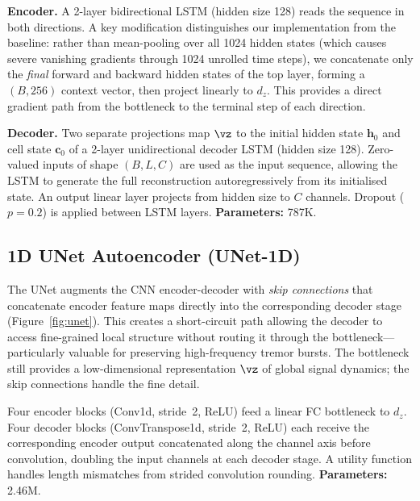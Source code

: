 \documentclass{article}
\begin{document}
\textbf{Encoder.}
A 2-layer bidirectional LSTM (hidden size 128) reads the sequence in both
directions.
A key modification distinguishes our implementation from the baseline:
rather than mean-pooling over all 1024 hidden states (which causes severe
vanishing gradients through 1024 unrolled time steps), we concatenate only
the \emph{final} forward and backward hidden states of the top layer,
forming a $(B, 256)$ context vector, then project linearly to $d_z$.
This provides a direct gradient path from the bottleneck to the terminal step
of each direction.

\textbf{Decoder.}
Two separate projections map $\vz$ to the initial hidden state $\mathbf{h}_0$
and cell state $\mathbf{c}_0$ of a 2-layer unidirectional decoder LSTM
(hidden size 128).
Zero-valued inputs of shape $(B, L, C)$ are used as the input sequence,
allowing the LSTM to generate the full reconstruction autoregressively from
its initialised state.
An output linear layer projects from hidden size to $C$ channels.
Dropout ($p=0.2$) is applied between LSTM layers.
\textbf{Parameters:} 787K.

\subsection{1D UNet Autoencoder (UNet-1D)}
\label{sec:unet}

The UNet \citep{ronneberger2015unet} augments the CNN encoder-decoder with
\emph{skip connections} that concatenate encoder feature maps directly into
the corresponding decoder stage (Figure~\ref{fig:unet}).
This creates a short-circuit path allowing the decoder to access fine-grained
local structure without routing it through the bottleneck---particularly
valuable for preserving high-frequency tremor bursts.
The bottleneck still provides a low-dimensional representation $\vz$ of global
signal dynamics; the skip connections handle the fine detail.

Four encoder blocks (Conv1d, stride~2, ReLU) feed a linear FC bottleneck to
$d_z$.
Four decoder blocks (ConvTranspose1d, stride~2, ReLU) each receive the
corresponding encoder output concatenated along the channel axis before
convolution, doubling the input channels at each decoder stage.
A utility function handles length mismatches from strided convolution rounding.
\textbf{Parameters:} 2.46M.

\end{document}
